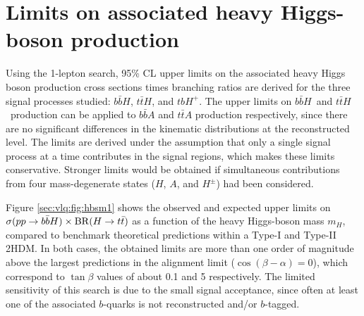 \section{Limits on associated heavy Higgs-boson production}

Using the 1-lepton search, 95\% CL upper limits on the associated heavy Higgs boson production cross sections times branching ratios are derived for the three signal processes studied: $b\bar{b}H$, $t\bar{t}H$, and $tbH^{+}$. 
The upper limits on $b\bar{b}H$\ and $t\bar{t}H$\ production can be applied to $b\bar{b}A$ and $t\bar{t}A$ production respectively, since there are no significant differences in the kinematic distributions at the reconstructed level. The limits are derived under the assumption that only a single signal process at a time contributes in the signal regions, which makes these limits conservative. Stronger limits would be obtained if simultaneous contributions from four mass-degenerate states ($H$, $A$, and $H^\pm$) had been considered.

Figure \ref{sec:vlq:fig:hbsm1} shows the observed and expected upper limits on $\sigma(pp \to b\bar{b}H) \times {\rm BR}(H \to t\bar{t})$
as a function of the heavy Higgs-boson mass $m_H$, compared to benchmark theoretical predictions within a Type-I and
Type-II 2HDM.  In both cases, the obtained limits are more than one order of magnitude above the largest predictions in the
alignment limit ($\cos(\beta-\alpha)=0$), which correspond to  $\tan\beta$ values of about 0.1 and 5 respectively. The limited sensitivity 
of this search is due to the small signal acceptance, since often at least one of the associated $b$-quarks is not reconstructed and/or $b$-tagged.

